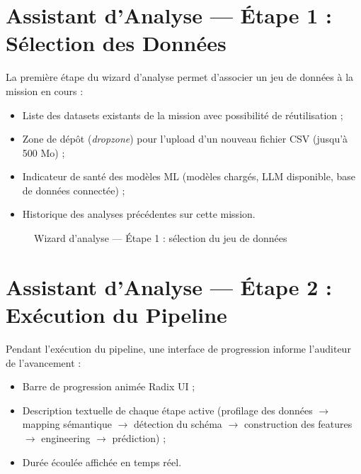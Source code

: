 \documentclass[12pt,a4paper,twoside]{report}
\theoremstyle{definition}
\begin{document}
\section{Assistant d'Analyse — Étape 1 : Sélection des Données}

La première étape du wizard d'analyse permet d'associer un jeu de données
à la mission en cours :

\begin{itemize}
  \item Liste des datasets existants de la mission avec possibilité de
    réutilisation ;
  \item Zone de dépôt (\textit{dropzone}) pour l'upload d'un nouveau fichier
    CSV (jusqu'à 500 Mo) ;
  \item Indicateur de santé des modèles ML (modèles chargés, LLM disponible,
    base de données connectée) ;
  \item Historique des analyses précédentes sur cette mission.
\end{itemize}

\begin{figure}[H]
\centering
{}
\caption{Wizard d'analyse — Étape 1 : sélection du jeu de données}
\label{fig:ui_wizard_step1}
\end{figure}

\section{Assistant d'Analyse — Étape 2 : Exécution du Pipeline}

Pendant l'exécution du pipeline, une interface de progression informe
l'auditeur de l'avancement :

\begin{itemize}
  \item Barre de progression animée Radix UI ;
  \item Description textuelle de chaque étape active (profilage des données
    $\rightarrow$ mapping sémantique $\rightarrow$ détection du schéma
    $\rightarrow$ construction des features $\rightarrow$ engineering
    $\rightarrow$ prédiction) ;
  \item Durée écoulée affichée en temps réel.
\end{itemize}
\end{document}
